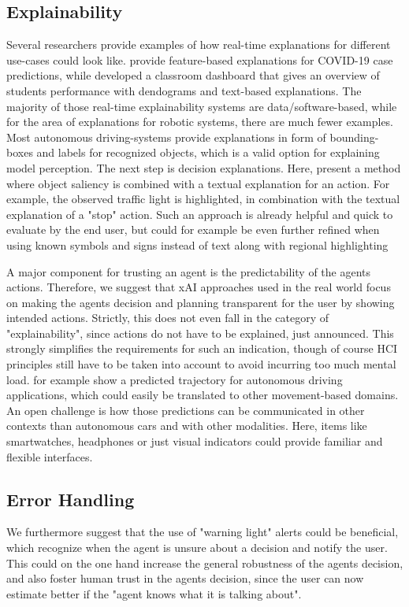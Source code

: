 \documentclass[twoside,11pt]{article}
\begin{document}
\subsection{Explainability}

Several researchers provide examples of how real-time explanations for different use-cases could look like. \cite{RodriguezEtAl:2021:DeepCovidxAI} provide feature-based explanations for COVID-19 case predictions, while \cite{Kulkarni:2021:EducationAIDashboard} developed a classroom dashboard that gives an overview of students performance with dendograms and text-based explanations. The majority of those real-time explainability systems are data/software-based, while for the area of explanations for robotic systems, there are much fewer examples.
Most autonomous driving-systems provide explanations in form of bounding-boxes and labels for recognized objects, which is a valid option for explaining model perception. 
The next step is decision explanations. Here, \cite{Ben-YounesEtAl:2022:DrivingBehaviorEx} present a method where object saliency is combined with a textual explanation for an action. For example, the observed traffic light is highlighted, in combination with the textual explanation of a "stop" action. Such an approach is already helpful and quick to evaluate by the end user, but could for example be even further refined when using known symbols and signs instead of text along with regional highlighting 

A major component for trusting an agent is the predictability of the agents actions. Therefore, we suggest that xAI approaches used in the real world focus on making the agents decision and planning transparent for the user by showing intended actions. Strictly, this does not even fall in the category of "explainability", since actions do not have to be explained, just announced. This strongly simplifies the requirements for such an indication, though of course HCI principles still have to be taken into account to avoid incurring too much mental load. \cite{Caltagarione:2017:DrivingPathGeneration} for example show a predicted trajectory for autonomous driving applications, which could easily be translated to other movement-based domains. 
An open challenge is how those predictions can be communicated in other contexts than autonomous cars and with other modalities. Here, items like smartwatches, headphones or just visual indicators could provide familiar and flexible interfaces.

\subsection{Error Handling}
We furthermore suggest that the use of "warning light" alerts could be beneficial, which recognize when the agent is unsure about a decision and notify the user. This could on the one hand increase the general robustness of the agents decision, and also foster human trust in the agents decision, since the user can now estimate better if the "agent knows what it is talking about".
\end{document}
